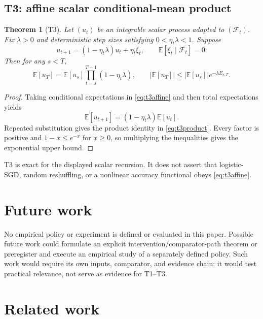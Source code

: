 \documentclass{article}
\newtheorem{theorem}{Theorem}
\begin{document}
\subsection{T3: affine scalar conditional-mean product}
\label{sec:t3}

\begin{theorem}[T3]
\label{thm:t3}
Let $(u_t)$ be an integrable scalar process adapted to
$(\mathcal F_t)$. Fix $\lambda>0$ and deterministic step sizes satisfying
$0<\eta_t\lambda<1$. Suppose
\begin{equation}
 u_{t+1}=(1-\eta_t\lambda)u_t+\eta_t\xi_t,\qquad
 \mathbb E[\xi_t\mid\mathcal F_t]=0.
\label{eq:t3affine}
\end{equation}
Then for any $s<T$,
\begin{equation}
 \mathbb E[u_T]=\mathbb E[u_s]\prod_{t=s}^{T-1}
 (1-\eta_t\lambda),\qquad
 |\mathbb E[u_T]|
 \leq|\mathbb E[u_s]|e^{-\lambda E_{s:T}}.
\label{eq:t3product}
\end{equation}
\end{theorem}

\begin{proof}
Taking conditional expectations in \eqref{eq:t3affine} and then total
expectations yields
\[
 \mathbb E[u_{t+1}]=(1-\eta_t\lambda)\mathbb E[u_t].
\]
Repeated substitution gives the product identity in \eqref{eq:t3product}.
Every factor is positive and $1-x\leq e^{-x}$ for $x\geq0$, so multiplying
the inequalities gives the exponential upper bound.
\end{proof}

T3 is exact for the displayed scalar recursion. It does not assert that
logistic-SGD, random reshuffling, or a nonlinear accuracy functional obeys
\eqref{eq:t3affine}.

\section{Future work}
\label{sec:empirical-status}

No empirical policy or experiment is defined or evaluated in this paper.
Possible future work could formulate an explicit intervention/comparator-path
theorem or preregister and execute an empirical study of a separately defined
policy. Such work would require its own inputs, comparator, and evidence
chain; it would test practical relevance, not serve as evidence for T1--T3.

\section{Related work}
\label{sec:related}
\end{document}
